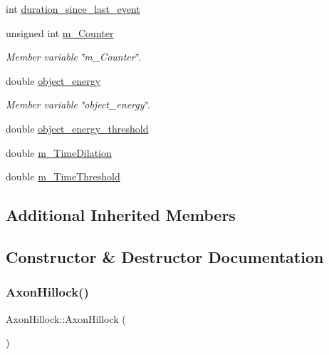 \begin{DoxyCompactItemize}
\item 
int \mbox{\hyperlink{classAxonHillock_a5b03b9c1c492e6c37b808d0756fce018}{duration\+\_\+since\+\_\+last\+\_\+event}}
\item 
unsigned int \mbox{\hyperlink{classAxonHillock_a4ce4c0d7438dfb7a77f6412460e1adcc}{m\+\_\+\+Counter}}
\begin{DoxyCompactList}\small\item\em Member variable \char`\"{}m\+\_\+\+Counter\char`\"{}. \end{DoxyCompactList}\item 
double \mbox{\hyperlink{classAxonHillock_a1ca9726d785ecc1dce0ac01933cf1dca}{object\+\_\+energy}}
\begin{DoxyCompactList}\small\item\em Member variable \char`\"{}object\+\_\+energy\char`\"{}. \end{DoxyCompactList}\item 
double \mbox{\hyperlink{classAxonHillock_a1fc144064d284978f785b1534a290d86}{object\+\_\+energy\+\_\+threshold}}
\item 
double \mbox{\hyperlink{classAxonHillock_ad3b4b4553315421c5a22f37dd94e2e94}{m\+\_\+\+Time\+Dilation}}
\item 
double \mbox{\hyperlink{classAxonHillock_acb8b1407116e6656c49e89c3a82bfd7c}{m\+\_\+\+Time\+Threshold}}
\end{DoxyCompactItemize}
\subsection*{Additional Inherited Members}


\subsection{Constructor \& Destructor Documentation}
\mbox{\label{classAxonHillock_a432095dfb25ece393cdd83b5eb4f097a}} 
\subsubsection{\texorpdfstring{Axon\+Hillock()}{AxonHillock()}\hspace{0.1cm}{\footnotesize\ttfamily [1/4]}}
{\footnotesize\ttfamily Axon\+Hillock\+::\+Axon\+Hillock (\begin{DoxyParamCaption}{ }\end{DoxyParamCaption})\hspace{0.3cm}{\ttfamily [inline]}}

